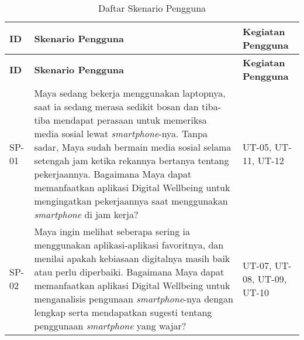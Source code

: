 
\RaggedLeft
\begin{footnotesize}
\begin{longtable}[c]{|W{c}{0.07\textwidth}|>{\ccnormspacing}m{0.6\textwidth}|>{\ccnormspacingcenter}m{0.24\textwidth}|}
  \caption{Daftar Skenario Pengguna}
  \label{tab:daftar_skenario} \\
  \hline {}
  \textbf{ID} & \centering\textbf{Skenario Pengguna} & \textbf{Kegiatan Pengguna} \\ \hline \endfirsthead
  \hline {}
  \textbf{ID} & \centering\textbf{Skenario Pengguna} & \textbf{Kegiatan Pengguna} \\ \hline \endhead

  \hline \endfoot
  
  SP-01 & Maya sedang bekerja menggunakan laptopnya, saat ia sedang merasa sedikit bosan dan tiba-tiba mendapat perasaan untuk memeriksa media sosial lewat \textit{smartphone}-nya. Tanpa sadar, Maya sudah bermain media sosial selama setengah jam ketika rekannya bertanya tentang pekerjaannya. Bagaimana Maya dapat memanfaatkan aplikasi Digital Wellbeing untuk mengingatkan pekerjaannya saat menggunakan \textit{smartphone} di jam kerja? & UT-05, UT-11, UT-12 \\ \hline
  
  SP-02 & Maya ingin melihat seberapa sering ia menggunakan aplikasi-aplikasi favoritnya, dan menilai apakah kebiasaan digitalnya masih baik atau perlu diperbaiki. Bagaimana Maya dapat memanfaatkan aplikasi Digital Wellbeing untuk menganalisis pengunaan \textit{smartphone}-nya dengan lengkap serta mendapatkan sugesti tentang penggunaan \textit{smartphone} yang wajar? & UT-07, UT-08, UT-09, UT-10 \\ \hline
  

\end{longtable}
\end{footnotesize}
